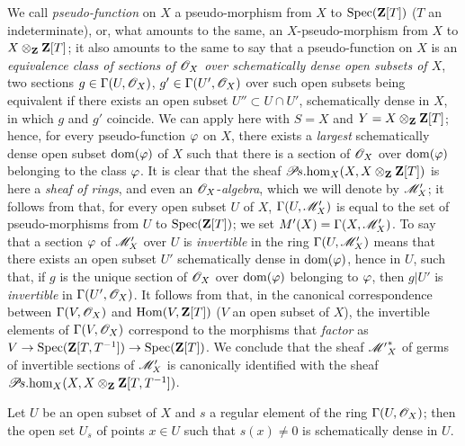 \begin{env}[20.2.8]\label{IV.20.2.8}
We call \emph{pseudo-function} on $X$ a pseudo-morphism from $X$ to $\operatorname{Spec}(\mathbf{Z}[T])$ ($T$ an indeterminate), or, what amounts to the same, an $X$-pseudo-morphism from $X$ to $X\otimes_{\mathbf{Z}}\mathbf{Z}[T]$; it also amounts to the same  to say that a pseudo-function on $X$ is an \emph{equivalence class of sections of $\mathscr{O}_X$ over schematically dense open subsets of $X$}, two sections $g\in\Gamma(U,\mathscr{O}_X)$, $g'\in\Gamma(U',\mathscr{O}_X)$ over such open subsets being equivalent if there exists an open subset $U''\subset U\cap U'$, schematically dense in $X$, in which $g$ and $g'$ coincide.
We can apply  here with $S=X$ and $Y=X\otimes_{\mathbf{Z}}\mathbf{Z}[T]$; hence, for every pseudo-function $\varphi$ on $X$, there exists a \emph{largest} schematically dense open subset $\operatorname{dom}(\varphi)$ of $X$ such that there is a section of $\mathscr{O}_X$ over $\operatorname{dom}(\varphi)$ belonging to the class $\varphi$.
It is clear that the sheaf $\mathscr{P}\!s.\!\operatorname{hom}_X(X,X\otimes_{\mathbf{Z}}\mathbf{Z}[T])$ is here a \emph{sheaf of rings}, and even an $\mathscr{O}_X$-\emph{algebra}, which we will denote by $\mathscr{M}'_X$; it follows from  that, for every open subset $U$ of $X$, $\Gamma(U,\mathscr{M}'_X)$ is equal to the set of pseudo-morphisms from $U$ to $\operatorname{Spec}(\mathbf{Z}[T])$; we set $M'(X)=\Gamma(X,\mathscr{M}'_X)$.
To say that a section $\varphi$ of $\mathscr{M}'_X$ over $U$ is \emph{invertible} in the ring $\Gamma(U,\mathscr{M}'_X)$ means that there exists an open subset $U'$ schematically dense in $\operatorname{dom}(\varphi)$, hence in $U$, such that, if $g$ is the unique section of $\mathscr{O}_X$ over $\operatorname{dom}(\varphi)$ belonging to $\varphi$, then $g|U'$ is \emph{invertible} in $\Gamma(U',\mathscr{O}_X)$.
It follows from  that, in the canonical correspondence between $\Gamma(V,\mathscr{O}_X)$ and $\operatorname{Hom}(V,\mathbf{Z}[T])$ ($V$ an open subset of $X$), the invertible elements of $\Gamma(V,\mathscr{O}_X)$ correspond to the morphisms that
\emph{factor} as $V\to\operatorname{Spec}(\mathbf{Z}[T,T^{-1}])\to\operatorname{Spec}(\mathbf{Z}[T])$.
We conclude that the sheaf ${\mathscr{M}'}^*_X$ of germs of invertible sections of $\mathscr{M}'_X$ is canonically identified with the sheaf $\mathscr{P}\!s.\!\operatorname{hom}_X(X,X\otimes_{\mathbf{Z}}\mathbf{Z}[T,T^{-1}])$.
\end{env}

\begin{lemma}[20.2.9]
\label{IV.20.2.9}
Let $U$ be an open subset of $X$ and $s$ a regular element of the ring $\Gamma(U,\mathscr{O}_X)$; then the open set $U_s$ of points $x\in U$ such that $s(x)\neq0$ is schematically dense in $U$.
\end{lemma}

